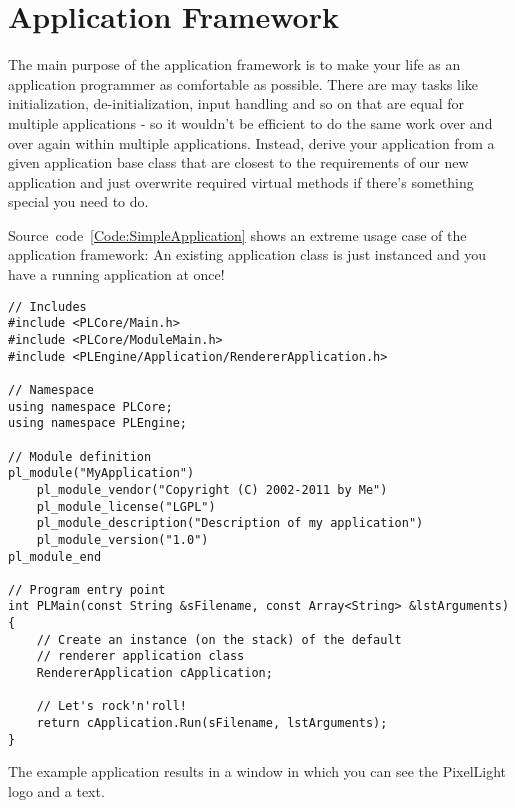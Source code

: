 \section{Application Framework}
The main purpose of the application framework is to make your life as an application programmer as comfortable as possible. There are may tasks like initialization, de-initialization, input handling and so on that are equal for multiple applications - so it wouldn't be efficient to do the same work over and over again within multiple applications. Instead, derive your application from a given application base class that are closest to the requirements of our new application and just overwrite required virtual methods if there's something special you need to do.

Source~code~\ref{Code:SimpleApplication} shows an extreme usage case of the application framework: An existing application class is just instanced and you have a running application at once!
\begin{lstlisting}[label=Code:SimpleApplication,caption={Simple application using the application framework}]
// Includes
#include <PLCore/Main.h>
#include <PLCore/ModuleMain.h>
#include <PLEngine/Application/RendererApplication.h>

// Namespace
using namespace PLCore;
using namespace PLEngine;

// Module definition
pl_module("MyApplication")
	pl_module_vendor("Copyright (C) 2002-2011 by Me")
	pl_module_license("LGPL")
	pl_module_description("Description of my application")
	pl_module_version("1.0")
pl_module_end

// Program entry point
int PLMain(const String &sFilename, const Array<String> &lstArguments)
{
	// Create an instance (on the stack) of the default
	// renderer application class
	RendererApplication cApplication;

	// Let's rock'n'roll!
	return cApplication.Run(sFilename, lstArguments);
}
\end{lstlisting}
The example application results in a window in which you can see the PixelLight logo and a text.
